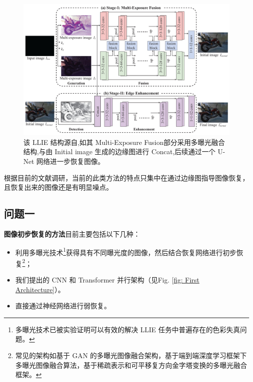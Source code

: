 \documentclass[a4paper, 10pt]{article}
\begin{document}
		\begin{figure}[htbp]
			\centering 
			\includegraphics[width=\columnwidth]{picture/LLIE/EEMEFN/EEMEFN framework}
			\caption{
				\label{fig: EEMEFN} 
				该 LLIE 结构源自\cite{zhu2020eemefn},如其 Multi-Exposure Fusion部分采用多曝光融合结构,与由 Initial image 生成的边缘图进行 Concat,后续通过一个 U-Net 网络进一步恢复图像。
			}
		\end{figure}
		
		根据目前的文献调研，当前的此类方法的特点只集中在通过边缘图指导图像恢复，且恢复出来的图像还是有明显噪点。
		
		\subsection{问题一} 
		
		\textbf{图像初步恢复的方法}目前主要包括以下几种：
		
		\begin{itemize}
			\item[(1)] 
			利用多曝光技术\footnote{多曝光技术已被实验证明可以有效的解决 LLIE 任务中普遍存在的色彩失真问题。}获得具有不同曝光度的图像，然后结合恢复网络进行初步恢复\footnote{常见的架构如基于 GAN 的多曝光图像融合架构，基于端到端深度学习框架下多曝光图像融合算法，基于稀疏表示和可平移复方向金字塔变换的多曝光融合框架。}；
			
			\item[(2)]
			我们提出的 CNN 和 Transformer 并行架构（见Fig. \ref{fig: First Architecture}）。
			
			\item[(3)]
			直接通过神经网络进行弱恢复。
			
		\end{itemize}	
		
\end{document}
